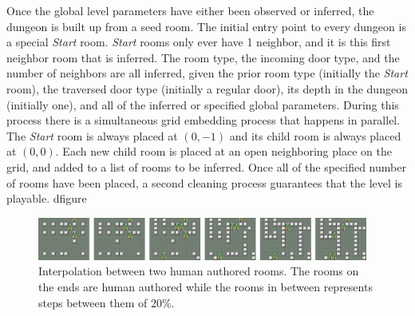 \documentclass[12pt]{report}
\begin{document}
Once the global level parameters have either been observed or inferred, the dungeon is built up from a seed room. The initial entry point to every dungeon is a special \textit{Start} room. \textit{Start} rooms only ever have 1 neighbor, and it is this first neighbor room that is inferred. The room type, the incoming door type, and the number of neighbors are all inferred, given the prior room type (initially the \textit{Start} room), the traversed door type (initially a regular door), its depth in the dungeon (initially one), and all of the inferred or specified global parameters. During this process there is a simultaneous grid embedding process that happens in parallel. The \textit{Start} room is always placed at $(0,-1)$ and its child room is always placed at $(0,0)$. Each new child room is placed at an open neighboring place on the grid, and added to a list of rooms to be inferred. Once all of the specified number of rooms have been placed, a second cleaning process guarantees that the level is playable. d{figure}


\begin{figure}[htbp!]
\centering
    \includegraphics[width=0.97\textwidth]{figures/PCAInterp.png}
    \caption{Interpolation between two human authored rooms.  The rooms on the ends are human authored while the rooms in between represents steps between them of 20\%.}
  \label{fig:PCAinterp}
\end{figure}
\end{document}
